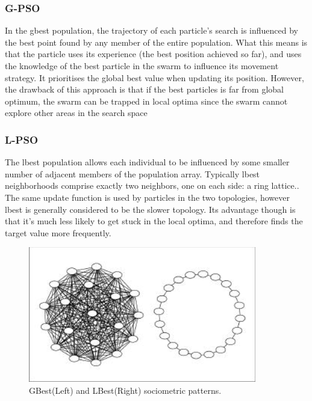 \documentclass[oneside,12pt]{book}
\begin{document}
\subsubsection{G-PSO}
In  the  gbest  population,  the trajectory  of  each  particle’s  search  is  influenced  by  the best point found by any member of the entire population\cite{kennedy2002population}. What this means is that the particle uses its experience (the best position achieved so far), and uses the knowledge of the best particle in the swarm to influence its movement strategy. It prioritises the global best value when updating its position.  However, the drawback of this approach is that if the best particles is far  from global optimum, the  swarm can  be  trapped in  local optima since the swarm cannot explore other areas in the search space \cite{azab_hady_hefny_2016}

\subsubsection{L-PSO}
The  lbest  population  allows  each  individual  to  be  influenced  by  some  smaller  number  of  adjacent  members  of the  population  array. Typically  lbest  neighborhoods comprise exactly two neighbors, one on each side: a ring lattice.\cite{kennedy2002population}. The same update function is used by particles in the two topologies, however lbest is generally considered to be the slower topology. Its advantage though is that it's much less likely to get stuck in the local optima, and therefore finds the target value more frequently. 

\begin{figure}[H]
    \centering
    \includegraphics[scale=1.0]{Images/NeighborhoodTopology.png}
    \caption{GBest(Left) and LBest(Right) sociometric patterns.\protect\cite{kennedy2002population}}
    \label{fig:GBest(Left) and LBest(Right) sociometric patterns.}
\end{figure}
\end{document}
